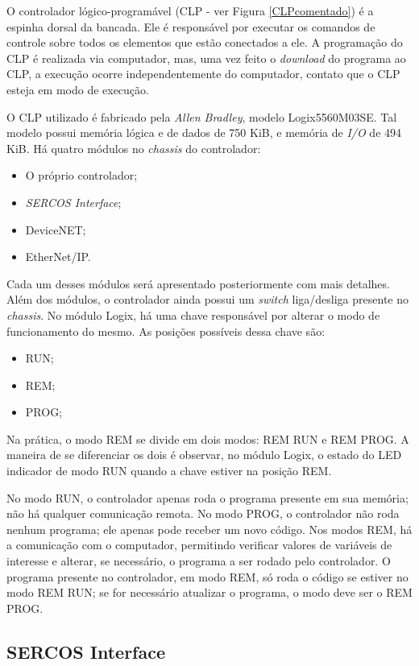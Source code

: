 O controlador lógico-programável (CLP - ver Figura \ref{CLPcomentado}) é a espinha dorsal da bancada. Ele é responsável por executar os comandos de controle sobre todos os elementos que estão conectados a ele. A programação do CLP é realizada via computador, mas, uma vez feito o \textit{download} do programa ao CLP, a execução ocorre independentemente do computador, contato que o CLP esteja em modo de execução.

O CLP utilizado é fabricado pela \textit{Allen Bradley}, modelo Logix5560M03SE. Tal modelo possui memória lógica e de dados de 750 KiB, e memória de \textit{I/O} de 494 KiB. Há quatro módulos no \textit{chassis} do controlador:
\begin{itemize}
  \item O próprio controlador;
  \item \textit{SERCOS Interface};
  \item DeviceNET;
  \item EtherNet/IP.
\end{itemize}

Cada um desses módulos será apresentado posteriormente com mais detalhes. Além dos módulos, o controlador ainda possui um \textit{switch} liga/desliga presente no \textit{chassis}. No módulo Logix, há uma chave responsável por alterar o modo de funcionamento do mesmo. As posições possíveis dessa chave são:
\begin{itemize}
  \item RUN;
  \item REM;
  \item PROG;
\end{itemize}

Na prática, o modo REM se divide em dois modos: REM RUN e REM PROG. A maneira de se diferenciar os dois é observar, no módulo Logix, o estado do LED indicador de modo RUN quando a chave estiver na posição REM.

No modo RUN, o controlador apenas roda o programa presente em sua memória; não há qualquer comunicação remota. No modo PROG, o controlador não roda nenhum programa; ele apenas pode receber um novo código. Nos modos REM, há a comunicação com o computador, permitindo verificar valores de variáveis de interesse e alterar, se necessário, o programa a ser rodado pelo controlador. O programa presente no controlador, em modo REM, só roda o código se estiver no modo REM RUN; se for necessário atualizar o programa, o modo deve ser o REM PROG.

\subsection{SERCOS Interface}

